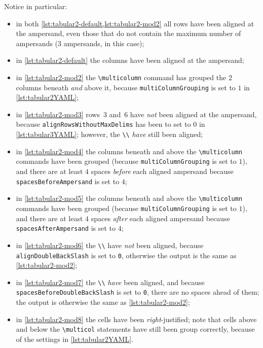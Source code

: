 \documentclass[10pt]{article}
\begin{document}
\begin{example}
 Notice in particular:
 \begin{itemize}
  \item in both \cref{lst:tabular2-default,lst:tabular2-mod2} all rows have been aligned
        at the ampersand, even those that do not contain the maximum number of ampersands
        (3 ampersands, in this case);
  \item in \cref{lst:tabular2-default} the columns have been aligned at the ampersand;
  \item in \cref{lst:tabular2-mod2} the \lstinline!\multicolumn! command has grouped the
        $2$ columns beneath \emph{and} above it, because \texttt{multiColumnGrouping} is
        set to $1$ in \cref{lst:tabular2YAML};
  \item in \cref{lst:tabular2-mod3} rows~3 and~6 have \emph{not} been aligned at the
        ampersand, because \texttt{alignRowsWithoutMaxDelims} has been to set to $0$ in
        \cref{lst:tabular3YAML}; however, the \lstinline!\\! \emph{have} still been
        aligned;
  \item in \cref{lst:tabular2-mod4} the columns beneath and above the
        \lstinline!\multicolumn! commands have been grouped (because
        \texttt{multiColumnGrouping} is set to $1$), and there are at least $4$ spaces
        \emph{before} each aligned ampersand because \texttt{spacesBeforeAmpersand} is
        set to $4$;
  \item in \cref{lst:tabular2-mod5} the columns beneath and above the
        \lstinline!\multicolumn! commands have been grouped (because
        \texttt{multiColumnGrouping} is set to $1$), and there are at least $4$ spaces
        \emph{after} each aligned ampersand because \texttt{spacesAfterAmpersand} is set
        to $4$;
  \item in \cref{lst:tabular2-mod6} the \lstinline!\\! have \emph{not} been aligned,
        because \texttt{alignDoubleBackSlash} is set to \texttt{0}, otherwise the output
        is the same as \cref{lst:tabular2-mod2};
  \item in \cref{lst:tabular2-mod7} the \lstinline!\\! \emph{have} been aligned, and
        because \texttt{spacesBeforeDoubleBackSlash} is set to \texttt{0}, there are no
        spaces ahead of them; the output is otherwise the same as
        \cref{lst:tabular2-mod2};
  \item in \cref{lst:tabular2-mod8} the cells have been \emph{right}-justified; note that
        cells above and below the \lstinline!\multicol! statements have still been group
        correctly, because of the settings in \cref{lst:tabular2YAML}.
 \end{itemize}
 \end{example}
\end{document}
